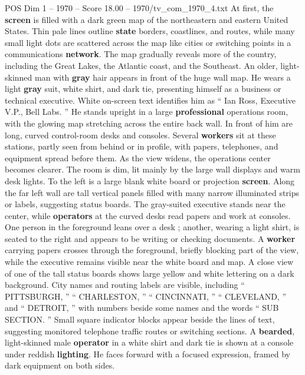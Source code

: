 \begin{textsample}{POS Dim 1 – 1970 – Score 18.00 – 1970/tv\_com\_1970\_4.txt}  \label{ex:f1_pos_061}
At first, the \textbf{screen} is filled with a dark green map of the northeastern and eastern United States.
Thin pale lines outline \textbf{state} borders, coastlines, and routes, while many small light dots are scattered across the map like cities or switching points in a communications \textbf{network}.
The map gradually reveals more of the country, including the Great Lakes, the Atlantic coast, and the Southeast.
An older, light-skinned man with \textbf{gray} hair appears in front of the huge wall map.
He wears a light \textbf{gray} suit, white shirt, and dark tie, presenting himself as a business or technical executive.
White on-screen text identifies him as “ Ian Ross, Executive V.P., Bell Labs. ” He stands upright in a large \textbf{professional} operations room, with the glowing map stretching across the entire back wall.
In front of him are long, curved control-room desks and consoles.
Several \textbf{workers} sit at these stations, partly seen from behind or in profile, with papers, telephones, and equipment spread before them.
As the view widens, the operations center becomes clearer.
The room is dim, lit mainly by the large wall displays and warm desk lights.
To the left is a large blank white board or projection \textbf{screen}.
Along the far left wall are tall vertical panels filled with many narrow illuminated strips or labels, suggesting status boards.
The gray-suited executive stands near the center, while \textbf{operators} at the curved desks read papers and work at consoles.
One person in the foreground leans over a desk ; another, wearing a light shirt, is seated to the right and appears to be writing or checking documents.
A \textbf{worker} carrying papers crosses through the foreground, briefly blocking part of the view, while the executive remains visible near the white board and map.
A close view of one of the tall status boards shows large yellow and white lettering on a dark background.
City names and routing labels are visible, including “ PITTSBURGH, ” “ CHARLESTON, ” “ CINCINNATI, ” “ CLEVELAND, ” and “ DETROIT, ” with numbers beside some names and the words “ SUB SECTION. ” Small square indicator blocks appear beside the lines of text, suggesting monitored telephone traffic routes or switching sections.
A \textbf{bearded}, light-skinned male \textbf{operator} in a white shirt and dark tie is shown at a console under reddish \textbf{lighting}.
He faces forward with a focused expression, framed by dark equipment on both sides.

\end{textsample}
